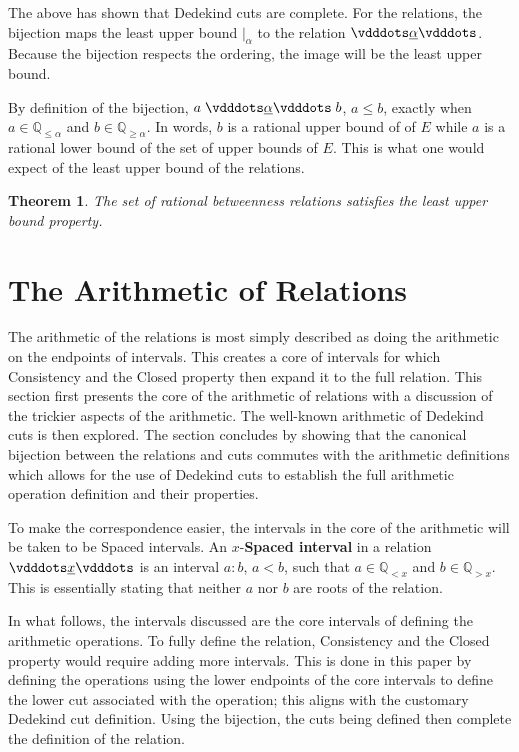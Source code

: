 \documentclass[12pt]{article}
\newtheorem{theorem}{Theorem}[section]
\newcommand{\qcut}[2][x]{\ensuremath{\mathbb{Q}_{#2 #1}}}
\newcommand{\qlt}[1][x]{\qcut[#1]{<}}
\newcommand{\qgt}[1][x]{\qcut[#1]{>}}
\newcommand{\qgeq}[1][x]{\qcut[#1]{\geq}}
\newcommand{\qleq}[1][x]{\qcut[#1]{\leq}}
\newcommand{\cut}[1][x]{{\vert}_{#1} }
\begin{document}
The above has shown that Dedekind cuts are complete. For the relations, the bijection  maps the least upper bound $\cut[\alpha]$ to the relation $\xrel[\alpha]$. Because the bijection respects the ordering, the image will be the least upper bound. 

By definition of the bijection, $a \xrel[\alpha] b$, $a \leq b$, exactly when $a \in \qleq [\alpha]$ and $b \in \qgeq[\alpha]$. In words, $b$ is a rational upper bound of of $E$ while $a$ is a rational lower bound of the set of upper bounds of $E$. This is what one would expect of the least upper bound of the relations. 

\begin{theorem}
    The set of rational betweenness relations satisfies the least upper bound property. 
\end{theorem}


\section{The Arithmetic of Relations}

The arithmetic of the relations is most simply described as doing the arithmetic on the endpoints of intervals. This creates a core of intervals for which Consistency and the Closed property then expand it to the full relation. This section first presents the core of the arithmetic of relations with a discussion of the trickier aspects of the arithmetic. The well-known arithmetic of Dedekind cuts is then explored. The section concludes by showing that the canonical bijection between the relations and cuts commutes with the arithmetic definitions which allows for the use of Dedekind cuts to establish the full arithmetic operation definition and their properties. 

To make the correspondence easier, the intervals in the core of the arithmetic will be taken to be Spaced intervals. An $x$-\textbf{Spaced interval} in a relation $\xrel$ is an interval $a:b$, $a < b$, such that $a \in \qlt$ and $b \in \qgt$. This is essentially stating that neither $a$ nor $b$ are roots of the relation. 

In what follows, the intervals discussed are the core intervals of defining the arithmetic operations. To fully define the relation, Consistency and the Closed property would require adding more intervals. This is done in this paper by defining the operations using the lower endpoints of the core intervals to define the lower cut associated with the operation; this aligns with the customary Dedekind cut definition. Using the bijection, the cuts being defined then complete the definition of the relation.  
\end{document}
